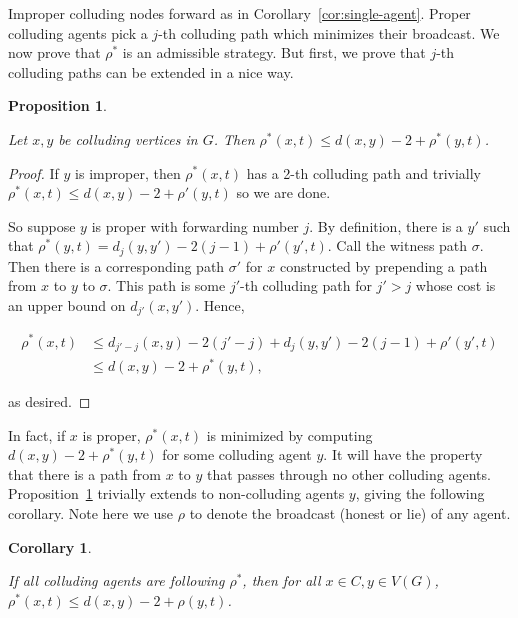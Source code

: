 \documentclass[reprint]{revtex4-1}
\newtheorem{proposition}{Proposition}[section]
\newtheorem{corollary}{Corollary}[section]
\begin{document}
Improper colluding nodes forward as in
Corollary~\ref{cor:single-agent}. Proper colluding agents pick a $j$-th
colluding path which minimizes their broadcast. We now prove
that $\rho^*$ is an admissible strategy. But first, we prove that $j$-th colluding paths can be extended in a
nice way.

\begin{proposition} \label{prop:inductive-path}

Let $x,y$ be colluding vertices in $G$. Then $\rho^*(x,t) \leq d(x,y) - 2 +
\rho^*(y,t)$.

\end{proposition}

\begin{proof}

If $y$ is improper, then $\rho^*(x,t)$ has a 2-th colluding path and trivially
$\rho^*(x,t) \leq d(x,y) - 2 + \rho'(y,t)$ so we are done.

So suppose $y$ is proper with forwarding number $j$. By definition, there is a
$y'$ such that $\rho^*(y,t) = d_j(y,y') - 2(j-1) + \rho'(y',t)$. Call the
witness path $\sigma$. Then there is a corresponding path $\sigma'$ for $x$
constructed by prepending a path from $x$ to $y$ to $\sigma$. This path is some
$j'$-th colluding path for $j' > j$ whose cost is an upper bound on
$d_{j'}(x,y')$.  Hence,

\begin{align*}
   \rho^*(x,t) &\leq d_{j'-j}(x,y) - 2(j' - j) + d_j(y,y') - 2(j-1) +
\rho'(y',t) \\
               &\leq d(x,y) - 2 + \rho^*(y,t),
\end{align*}

as desired.
\end{proof}

In fact, if $x$ is proper, $\rho^*(x,t)$ is minimized by computing $d(x,y) - 2
+ \rho^*(y,t)$ for some colluding agent $y$. It will have the property that
there is a path from $x$ to $y$ that passes through no other colluding agents.
Proposition~\ref{prop:inductive-path} trivially extends to non-colluding agents
$y$, giving the following corollary. Note here we use $\rho$ to denote the
broadcast (honest or lie) of any agent.

\begin{corollary} \label{cor:rhostar-bound}

If all colluding agents are following $\rho^*$, then for all $x \in C, y \in
V(G)$, $\rho^*(x,t) \leq d(x,y) - 2 + \rho(y,t)$.

\end{corollary}
\end{document}
